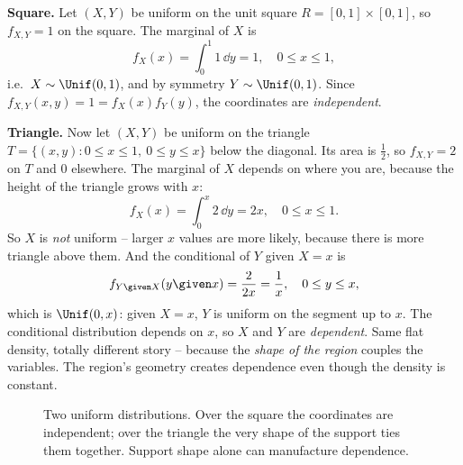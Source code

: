 \begin{example}
\label{ch13:ex-uniform-square-triangle}
\textbf{Square.} Let $(X,Y)$ be uniform on the unit square
$R=[0,1]\times[0,1]$, so $f_{X,Y}=1$ on the square. The marginal of $X$ is
\[
  f_X(x) = \int_0^1 1\,\dd y = 1, \quad 0\le x\le 1,
\]
i.e.\ $X\sim\Unif(0,1)$, and by symmetry $Y\sim\Unif(0,1)$. Since
$f_{X,Y}(x,y) = 1 = f_X(x)f_Y(y)$, the coordinates are \emph{independent}.

\textbf{Triangle.} Now let $(X,Y)$ be uniform on the triangle
$T=\{(x,y): 0\le x\le 1,\ 0\le y\le x\}$ below the diagonal. Its area is
$\tfrac12$, so $f_{X,Y}=2$ on $T$ and $0$ elsewhere. The marginal of $X$ depends
on where you are, because the height of the triangle grows with $x$:
\[
  f_X(x) = \int_0^x 2\,\dd y = 2x, \quad 0\le x\le 1.
\]
So $X$ is \emph{not} uniform -- larger $x$ values are more likely, because there
is more triangle above them. And the conditional of $Y$ given $X=x$ is
\[
  f_{Y\given X}(y\given x) = \frac{2}{2x} = \frac1x, \quad 0\le y\le x,
\]
which is $\Unif(0,x)$: given $X=x$, $Y$ is uniform on the segment up to $x$. The
conditional distribution depends on $x$, so $X$ and $Y$ are \emph{dependent}.
Same flat density, totally different story -- because the \emph{shape of the
region} couples the variables. The region's geometry creates dependence even
though the density is constant.
\end{example}

\begin{figure}[H]
\centering
{}
\caption{Two uniform distributions. Over the square the coordinates are
independent; over the triangle the very shape of the support ties them together.
Support shape alone can manufacture dependence.}
\label{ch13:fig-square-triangle}
\end{figure}

